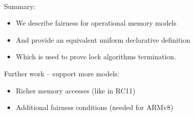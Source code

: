 \begin{frame}{}\ 
  
  {\large Summary:}
  \begin{itemize}
  \item We describe fairness for operational memory models
  \item And provide an equivalent uniform declarative definition
  \item Which is used to prove lock algorithms termination.
  \end{itemize}


  {\large Further work -- support more models:}
  \begin{itemize}
  \item Richer memory accesses (like in RC11)
  \item Additional fairness conditions (needed for ARMv8)
  \end{itemize}
\end{frame}

